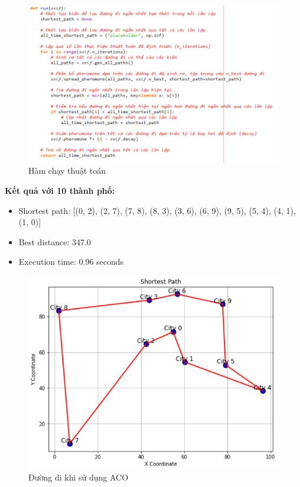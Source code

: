 \documentclass[14pt]{article}
\begin{document}
\begin{center}
\begin{figure}[htbp]
			\centering
			\includegraphics[width=\textwidth]{./Image/Hàm chạy ACO.png}
			\caption{Hàm chạy thuật toán}
			\label{fig:mylabel}
		\end{figure}
	\end{center}

	\newpage
	\textbf{Kết quả với 10 thành phố:}
	\begin{itemize}
	 	\item Shortest path: [(0, 2), (2, 7), (7, 8), (8, 3), (3, 6), (6, 9), (9, 5), (5, 4), (4, 1), (1, 0)]
	 	\item Best distance: 347.0
	 	\item Execution time: 0.96 seconds
	\end{itemize}
	\begin{figure}[htbp]
		\centering
		\includegraphics[width=\textwidth]{./Image/ACO 10 city.png}
		\caption{Đường di khi sử dụng ACO}
		\label{fig:mylabel}
	\end{figure}
\end{document}
